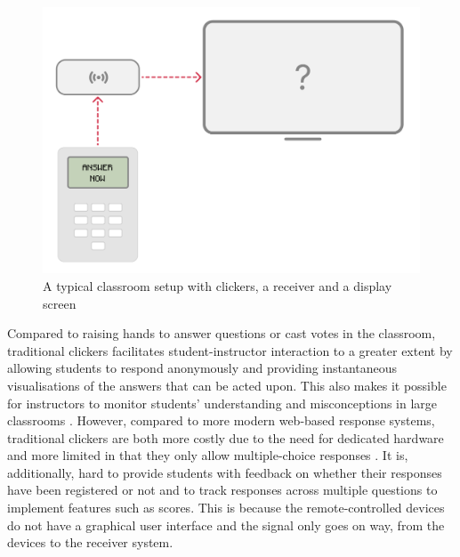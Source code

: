 \begin{figure}[h!]
    \centering
    \includegraphics[width=.8\linewidth]{figures/clickers-illustration.png}
    \caption{A typical classroom setup with clickers, a receiver and a display screen}
    \label{fig:clickersetup}
\end{figure}

Compared to raising hands to answer questions or cast votes in the classroom, traditional clickers facilitates student-instructor interaction to a greater extent by allowing students to respond anonymously and providing instantaneous visualisations of the answers that can be acted upon. This also makes it possible for instructors to monitor students' understanding and misconceptions in large classrooms \cite{hunsu2016}. However, compared to more modern web-based response systems, traditional clickers are both more costly due to the need for dedicated hardware and more limited in that they only allow multiple-choice responses \cite{resyslitrev}. It is, additionally, hard to provide students with feedback on whether their responses have been registered or not and to track responses across multiple questions to implement features such as scores. This is because the remote-controlled devices do not have a graphical user interface and the signal only goes on way, from the devices to the receiver system.

